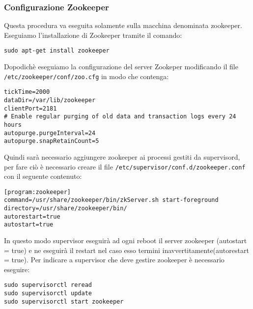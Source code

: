 \documentclass[12pt]{article}
\begin{document}
\subsubsection{Configurazione Zookeeper}
Questa procedura va eseguita solamente sulla macchina denominata zookeeper.\\
Eseguiamo l'installazione di Zookeeper tramite il comando:
\begin{lstlisting}
sudo apt-get install zookeeper
\end{lstlisting}
Dopodich\`e eseguiamo la configurazione del server Zookeper modificando il file \texttt{/etc/zookeeper/conf/zoo.cfg} in modo che contenga:
\begin{lstlisting}
tickTime=2000
dataDir=/var/lib/zookeeper
clientPort=2181
# Enable regular purging of old data and transaction logs every 24 hours
autopurge.purgeInterval=24
autopurge.snapRetainCount=5
\end{lstlisting}
Quindi sar\`a necessario aggiungere zookeeper ai processi gestiti da supervisord, per fare ci\`o \`e necessario creare il file \texttt{/etc/supervisor/conf.d/zookeeper.conf} con il seguente contenuto:
\begin{lstlisting}
[program:zookeeper]
command=/usr/share/zookeeper/bin/zkServer.sh start-foreground
directory=/usr/share/zookeeper/bin/
autorestart=true
autostart=true
\end{lstlisting}
In questo modo supervisor eseguir\`a ad ogni reboot il server zookeeper (autostart = true) e ne eseguir\`a il restart nel caso esso termini inavvertitamente(autorestart = true).
Per indicare a supervisor che deve gestire zookeeper \`e necessario eseguire:
\begin{lstlisting}
sudo supervisorctl reread
sudo supervisorctl update
sudo supervisorctl start zookeeper
\end{lstlisting}
\end{document}
